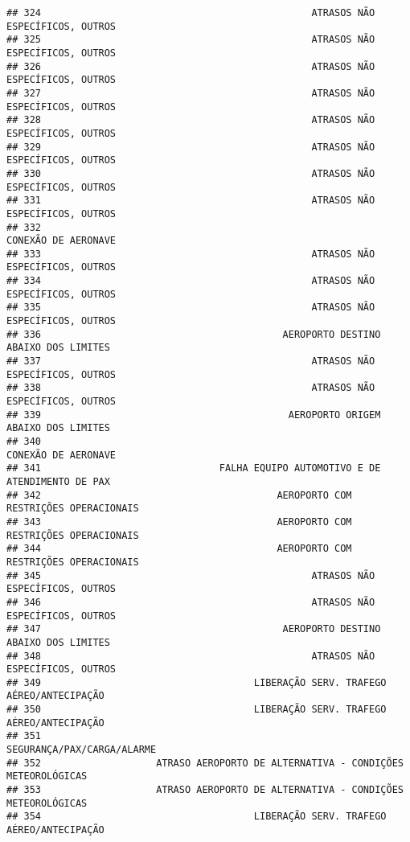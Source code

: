 \documentclass[
]{article}
\begin{document}
\begin{verbatim}
## 324                                               ATRASOS NÃO ESPECÍFICOS, OUTROS
## 325                                               ATRASOS NÃO ESPECÍFICOS, OUTROS
## 326                                               ATRASOS NÃO ESPECÍFICOS, OUTROS
## 327                                               ATRASOS NÃO ESPECÍFICOS, OUTROS
## 328                                               ATRASOS NÃO ESPECÍFICOS, OUTROS
## 329                                               ATRASOS NÃO ESPECÍFICOS, OUTROS
## 330                                               ATRASOS NÃO ESPECÍFICOS, OUTROS
## 331                                               ATRASOS NÃO ESPECÍFICOS, OUTROS
## 332                                                           CONEXÃO DE AERONAVE
## 333                                               ATRASOS NÃO ESPECÍFICOS, OUTROS
## 334                                               ATRASOS NÃO ESPECÍFICOS, OUTROS
## 335                                               ATRASOS NÃO ESPECÍFICOS, OUTROS
## 336                                          AEROPORTO DESTINO ABAIXO DOS LIMITES
## 337                                               ATRASOS NÃO ESPECÍFICOS, OUTROS
## 338                                               ATRASOS NÃO ESPECÍFICOS, OUTROS
## 339                                           AEROPORTO ORIGEM ABAIXO DOS LIMITES
## 340                                                           CONEXÃO DE AERONAVE
## 341                               FALHA EQUIPO AUTOMOTIVO E DE ATENDIMENTO DE PAX
## 342                                         AEROPORTO COM RESTRIÇÕES OPERACIONAIS
## 343                                         AEROPORTO COM RESTRIÇÕES OPERACIONAIS
## 344                                         AEROPORTO COM RESTRIÇÕES OPERACIONAIS
## 345                                               ATRASOS NÃO ESPECÍFICOS, OUTROS
## 346                                               ATRASOS NÃO ESPECÍFICOS, OUTROS
## 347                                          AEROPORTO DESTINO ABAIXO DOS LIMITES
## 348                                               ATRASOS NÃO ESPECÍFICOS, OUTROS
## 349                                     LIBERAÇÃO SERV. TRAFEGO AÉREO/ANTECIPAÇÃO
## 350                                     LIBERAÇÃO SERV. TRAFEGO AÉREO/ANTECIPAÇÃO
## 351                                                    SEGURANÇA/PAX/CARGA/ALARME
## 352                    ATRASO AEROPORTO DE ALTERNATIVA - CONDIÇÕES METEOROLÓGICAS
## 353                    ATRASO AEROPORTO DE ALTERNATIVA - CONDIÇÕES METEOROLÓGICAS
## 354                                     LIBERAÇÃO SERV. TRAFEGO AÉREO/ANTECIPAÇÃO

\end{verbatim}
\end{document}

